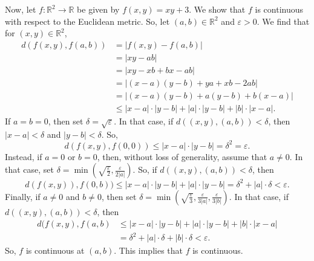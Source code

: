 \documentclass[a4paper, openany]{memoir}
\theoremstyle{definition}
\theoremstyle{plain}
\begin{document}
Now, let $f: \mathbb{R}^2 \to \mathbb{R}$ be given by $f(x, y) = xy + 3$. We show that $f$ is continuous with respect to the Euclidean metric. So, let $(a, b) \in \mathbb{R}^2$ and $\varepsilon > 0$. We find that for $(x, y) \in \mathbb{R}^2$,
\begin{align*}
    d(f(x, y), f(a, b)) &= |f(x, y) - f(a, b)| \\
    &= |xy - ab| \\
    &= |xy - xb + bx - ab| \\
    &= |(x-a)(y-b) + ya + xb - 2ab| \\
    &= |(x-a)(y-b) + a(y-b) + b(x-a)| \\
    &\leqslant |x-a| \cdot |y-b| + |a| \cdot |y-b| + |b| \cdot |x-a|.
\end{align*}
If $a = b = 0$, then set $\delta = \sqrt{\varepsilon}$. In that case, if $d((x, y), (a, b)) < \delta$, then $|x-a| < \delta$ and $|y-b| < \delta$. So,
\[d(f(x, y), f(0,0)) \leqslant |x-a| \cdot |y-b| = \delta^2 = \varepsilon.\]
Instead, if $a = 0$ or $b = 0$, then, without loss of generality, assume that $a \neq 0$. In that case, set $\delta = \min(\sqrt{\frac{\varepsilon}{2}}, \frac{\varepsilon}{2|a|})$. So, if $d((x, y), (a, b)) < \delta$, then
\[d(f(x, y)), f(0, b)) \leqslant |x-a| \cdot |y-b| + |a| \cdot |y-b| = \delta^2 + |a| \cdot \delta < \varepsilon.\]
Finally, if $a \neq 0$ and $b \neq 0$, then set $\delta = \min(\sqrt{\frac{\varepsilon}{3}}, \frac{\varepsilon}{3|a|}, \frac{\varepsilon}{3|b|})$. In that case, if $d((x, y), (a, b)) < \delta$, then
\begin{align*}
    d(f(x, y), f(a, b) &\leqslant |x-a| \cdot |y-b| + |a| \cdot |y-b| + |b| \cdot |x-a| \\
    &= \delta^2 + |a| \cdot \delta + |b| \cdot \delta < \varepsilon.
\end{align*}
So, $f$ is continuous at $(a, b)$. This implies that $f$ is continuous.
\end{document}
